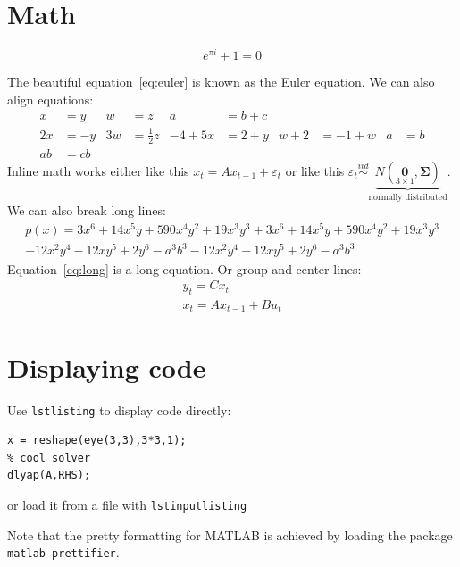 \documentclass[a4paper]{scrartcl}
\begin{document}
\section{Math}
\begin{equation}
e^{\pi i} + 1 = 0\label{eq:euler}
\end{equation}

The beautiful equation~\eqref{eq:euler} is known as the Euler equation. We can also align equations:
\begin{align*}
x &= y & w &= z & a &= b + c
\\
2x &= -y & 3w &= \frac{1}{2}z & -4 + 5x &= 2 + y & w + 2 &= -1 + w & a & = b
\\
ab &= cb
\end{align*}
Inline math works either like this $x_t = A x_{t-1} + \varepsilon_t$ or like this \(\varepsilon_t \overset{iid}\sim \underbrace{N(\underset{3 \times 1}{\boldsymbol{0}},\boldsymbol{\Sigma})}_{\text{normally distributed}}\).
We can also break long lines:
\begin{multline}
p(x) = 3x^6 + 14x^5y + 590x^4y^2 + 19x^3y^3 + 3x^6 + 14x^5y + 590x^4y^2 + 19x^3y^3
\\
- 12x^2y^4 - 12xy^5 + 2y^6 - a^3b^3 - 12x^2y^4 - 12xy^5 + 2y^6 - a^3b^3 \label{eq:long}
\end{multline}
Equation~\eqref{eq:long} is a long equation.
Or group and center lines:
\begin{gather*}
y_t = C x_{t}
\\
x_t = A x_{t-1} + Bu_t
\end{gather*}

\section{Displaying code}
Use \texttt{lstlisting} to display code directly:
\begin{lstlisting}[style = Matlab-editor, basicstyle = \mlttfamily, title = \lstname]
% reshape example
x = reshape(eye(3,3),3*3,1);
% cool solver
dlyap(A,RHS);
\end{lstlisting}
or load it from a file with \texttt{lstinputlisting}

Note that the pretty formatting for MATLAB is achieved by loading the package \texttt{matlab-prettifier}.
\end{document}
